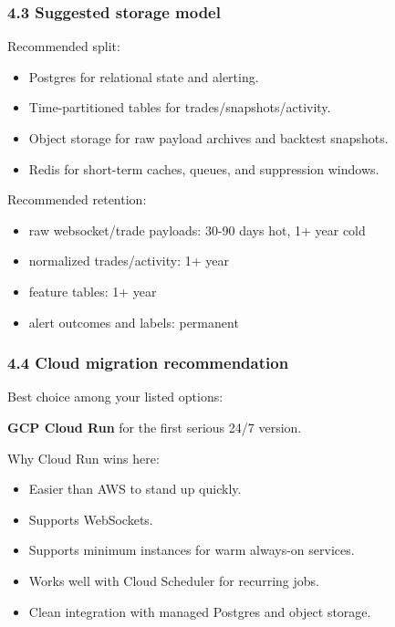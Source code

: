 \documentclass[
]{article}
\providecommand{\tightlist}{%
  \setlength{\itemsep}{0pt}\setlength{\parskip}{0pt}}
\begin{document}
\subsubsection{4.3 Suggested storage
model}\label{43-suggested-storage-model}

Recommended split:

\begin{itemize}
\tightlist
\item
  Postgres for relational state and alerting.
\item
  Time-partitioned tables for trades/snapshots/activity.
\item
  Object storage for raw payload archives and backtest snapshots.
\item
  Redis for short-term caches, queues, and suppression windows.
\end{itemize}

Recommended retention:

\begin{itemize}
\tightlist
\item
  raw websocket/trade payloads: 30-90 days hot, 1+ year cold
\item
  normalized trades/activity: 1+ year
\item
  feature tables: 1+ year
\item
  alert outcomes and labels: permanent
\end{itemize}

\subsubsection{4.4 Cloud migration
recommendation}\label{44-cloud-migration-recommendation}

Best choice among your listed options:

\textbf{GCP Cloud Run} for the first serious 24/7 version.

Why Cloud Run wins here:

\begin{itemize}
\tightlist
\item
  Easier than AWS to stand up quickly.
\item
  Supports WebSockets.
\item
  Supports minimum instances for warm always-on services.
\item
  Works well with Cloud Scheduler for recurring jobs.
\item
  Clean integration with managed Postgres and object storage.
\end{itemize}
\end{document}
